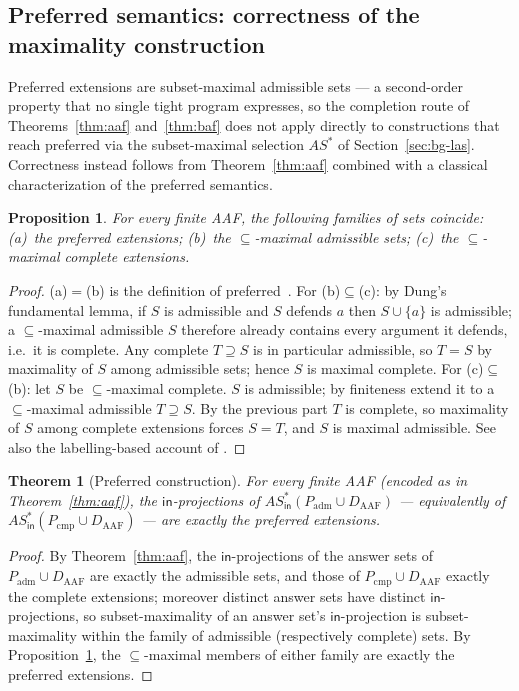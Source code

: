 \documentclass[review,12pt]{elsarticle}
\newtheorem{theorem}{Theorem}
\newtheorem{proposition}{Proposition}
\theoremstyle{definition}
\theoremstyle{remark}
\newcommand{\pred}[1]{\textsf{#1}}
\newcommand{\ASstar}{\mathit{AS}^{*}}
\newcommand{\Daaf}{D_{\mathrm{AAF}}}
\begin{document}
\subsection{Preferred semantics: correctness of the maximality construction}
\label{sec:prf}

Preferred extensions are subset-maximal admissible sets --- a second-order
property that no single tight program expresses, so the completion route of
Theorems~\ref{thm:aaf} and~\ref{thm:baf} does not apply directly to
constructions that reach preferred via the subset-maximal selection
$\ASstar$ of Section~\ref{sec:bg-las}. Correctness instead follows from
Theorem~\ref{thm:aaf} combined with a classical characterization of the
preferred semantics.

\begin{proposition}
\label{prop:prfmax}
For every finite AAF, the following families of sets coincide:
(a)~the preferred extensions; (b)~the $\subseteq$-maximal admissible sets;
(c)~the $\subseteq$-maximal complete extensions.
\end{proposition}

\begin{proof}
(a)$=$(b) is the definition of preferred~\citep{dung1995}. For (b)$\subseteq$(c):
by Dung's fundamental lemma, if $S$ is admissible and $S$ defends $a$ then
$S\cup\{a\}$ is admissible; a $\subseteq$-maximal admissible $S$ therefore
already contains every argument it defends, i.e.\ it is complete. Any complete
$T\supseteq S$ is in particular admissible, so $T=S$ by maximality of $S$
among admissible sets; hence $S$ is maximal complete. For
(c)$\subseteq$(b): let $S$ be $\subseteq$-maximal complete. $S$ is admissible;
by finiteness extend it to a $\subseteq$-maximal admissible $T\supseteq S$.
By the previous part $T$ is complete, so maximality of $S$ among complete
extensions forces $S=T$, and $S$ is maximal admissible.
See also the labelling-based account of \citet{caminada2009}.
\end{proof}

\begin{theorem}[Preferred construction]
\label{thm:prf}
For every finite AAF (encoded as in Theorem~\ref{thm:aaf}), the
$\pred{in}$-projections of
$\ASstar_{\pred{in}}(P_{\mathrm{adm}}\cup\Daaf)$ --- equivalently of
$\ASstar_{\pred{in}}(P_{\mathrm{cmp}}\cup\Daaf)$ --- are exactly the preferred
extensions.
\end{theorem}

\begin{proof}
By Theorem~\ref{thm:aaf}, the $\pred{in}$-projections of the answer sets of
$P_{\mathrm{adm}}\cup\Daaf$ are exactly the admissible sets, and those of
$P_{\mathrm{cmp}}\cup\Daaf$ exactly the complete extensions; moreover distinct
answer sets have distinct $\pred{in}$-projections, so subset-maximality of an
answer set's $\pred{in}$-projection is subset-maximality within the family of
admissible (respectively complete) sets. By
Proposition~\ref{prop:prfmax}, the $\subseteq$-maximal members of either
family are exactly the preferred extensions.
\end{proof}
\end{document}
